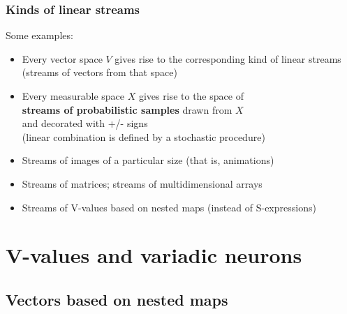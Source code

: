 \documentclass{beamer}
\newcommand{\msmagenta}[1]{{\color{mymagenta} #1}}
\begin{document}
\begin{frame}

\frametitle{Kinds of linear streams}

 Some examples:\\[1ex]


\begin{itemize}


\item Every vector space $V$ gives rise to the corresponding kind of linear streams
(streams of vectors from that space)\\[2ex]

\item Every measurable space $X$ gives rise to the space of\\ {\bf streams of
probabilistic samples} drawn from $X$\\ and decorated with +/- signs\\
(linear combination is defined by a stochastic procedure)\\[2ex]

\item Streams of images of a particular size (that is, animations)\\[2ex]

\item Streams of matrices; streams of multidimensional arrays\\[2ex]

\item \msmagenta{Streams of V-values based on nested maps (instead of S-expressions)}\\[2ex]



\end{itemize}

\end{frame}












\section{V-values and variadic neurons}







\subsection{Vectors based on nested maps}
\end{document}
